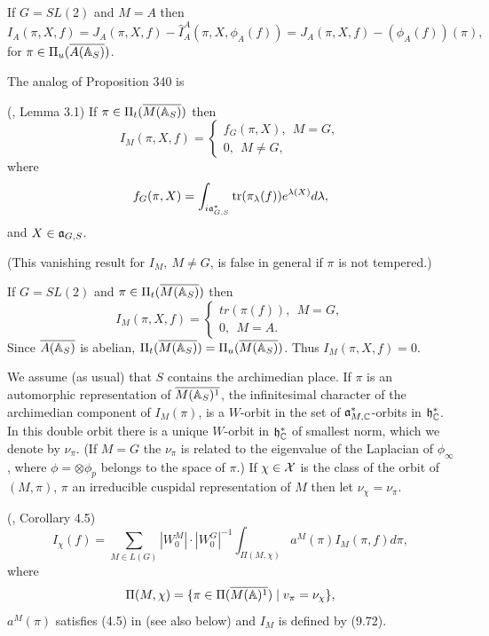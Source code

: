 \begin{example}
If $G=SL(2)$ and $M=A$ then
\[
I_A(\pi,X,f)
=J_A(\pi,X,f)-
\hat{I}_A^A(\pi,X,\phi_A(f))
=J_A(\pi,X,f)-(\phi_A(f))(\pi),
\]
for $\pi\in \Pi_u(\overline{A({\Bbb{A}}_S)})$.
\end{example}

The analog of Proposition 340 is

\begin{proposition}
(\cite{A9}, Lemma 3.1) If $\pi\in\Pi_t(\overline{M({\Bbb{A}}_S)})$ then
\[
I_M(\pi,X,f)=
\left\{
\begin{array}{c}
 f_G(\pi,X),\ \ M=G,\\
 0,\ \ M\not= G,
\end{array}
\right.
\]
where
\[
f_G(\pi,X)=
\int_{i{\frak{a}}^*_{G,S}}
{\rm tr}(\pi_\lambda(f))e^{\lambda(X)}d\lambda,
\]
and $X\in {\frak{a}}_{G,S}$.
\end{proposition}

(This vanishing result for $I_M,\ M\not=G$, is false in
general if $\pi$ is not tempered.)

\begin{example} If $G=SL(2)$ and
$\pi\in\Pi_t(\overline{M({\Bbb{A}}_S)})$ then
\[
I_M(\pi,X,f)=
\left\{
\begin{array}{c}
 tr(\pi(f)),\ \ M=G,\\
 0,\ \ M= A.
\end{array}
\right.
\]
Since $\overline{A({\Bbb{A}}_S)}$ is abelian,
$\Pi_t(\overline{M({\Bbb{A}}_S)})=
\Pi_u(\overline{M({\Bbb{A}}_S)})$. Thus
$I_M(\pi,X,f)=0$.
\end{example}

We assume (as usual) that $S$ contains the archimedian place.
If $\pi$ is an automorphic representation of
$\overline{M({\Bbb{A}}_S)^1}$,
the infinitesimal character of the archimedian
component of $I_M(\pi)$, is a $W$-orbit in the set of
${\frak{a}}_{M,{\Bbb{C}}}^*$-orbits in ${\frak{h}}_{\Bbb{C}}^*$.
In this double orbit there is a unique
$W$-orbit in ${\frak{h}}_{\Bbb{C}}^*$ of smallest norm, which we denote by
$\nu_\pi$. (If $M=G$ the $\nu_\pi$ is related to the eigenvalue
of the Laplacian of $\phi_\infty$,
where $\phi =\otimes \phi_p$
belongs to the space of $\pi$.)
If $\chi\in {\cal{X}}$ is the class of the orbit of
$(M,\pi)$, $\pi$ an irreducible cuspidal representation of $M$ then let
$\nu_\chi =\nu_\pi$.

\begin{theorem} (\cite{A10}, Corollary 4.5) 
\[
I_\chi
(f)
=\sum_{M\in L(G)}|W_0^M|\cdot |W_0^G|^{-1}
\int_{\Pi (M,\chi)}a^M(\pi )I_M(\pi ,f)d\pi ,
\]
where 
\[
\Pi (M,\chi )=
\{\pi \in \Pi (\overline{M({\Bbb{A}})^1})\;|\;v_\pi =\nu_\chi \},
\]
$a^M(\pi )$ satisfies (4.5) in \cite{A10} (see also below)
and $I_M$ is defined by (9.72).
\end{theorem}

